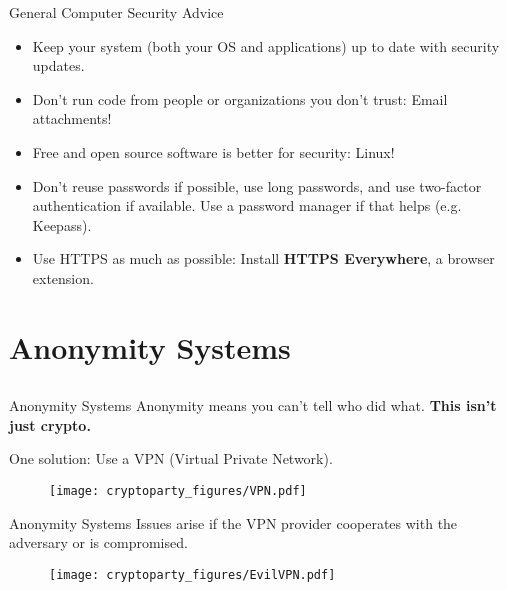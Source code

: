 \documentclass{beamer}
\begin{document}
\begin{frame}{General Computer Security Advice}


\begin{itemize}
   \item<1> Keep your system (both your OS and applications) up to date with security updates.
   \item<2> Don't run code from people or organizations you don't trust: Email attachments!
   \item<3> Free and open source software is better for security: Linux!
   \item<4> Don't reuse passwords if possible, use long passwords, and use two-factor authentication if available. Use a password manager if that helps (e.g. Keepass).
   \item<5> Use HTTPS as much as possible: Install \textbf{HTTPS Everywhere}, a browser extension.
\end{itemize}
\end{frame}

\section{Anonymity Systems}
\subsection{}

\begin{frame}{Anonymity Systems}
Anonymity means you can't tell who did what. \textbf{This isn't just crypto.}
\bigskip

One solution: Use a VPN (Virtual Private Network). 

\begin{figure}
\centering
\texttt{[image: cryptoparty\_figures/VPN.pdf]}
\end{figure}

\end{frame}

\begin{frame}{Anonymity Systems}
Issues arise if the VPN provider cooperates with the adversary or is compromised.\bigskip

\begin{figure}
\centering
\texttt{[image: cryptoparty\_figures/EvilVPN.pdf]}
\end{figure}

\end{frame}
\end{document}
